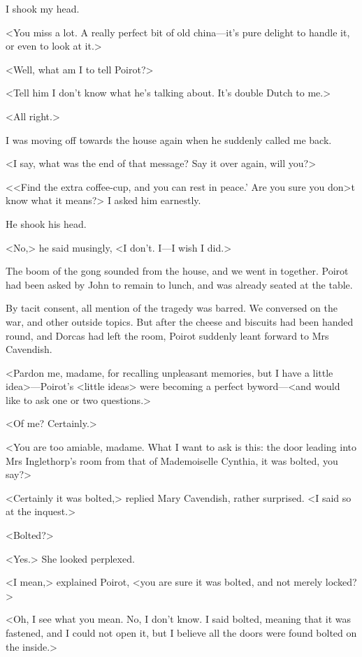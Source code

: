  I shook my head. 

 <You miss a lot. A really perfect bit of old china—it's pure delight to handle it, or even to look at it.> 

 <Well, what am I to tell Poirot?> 

 <Tell him I don't know what he's talking about. It's double Dutch to me.> 

 <All right.> 

 I was moving off towards the house again when he suddenly called me back. 

 <I say, what was the end of that message? Say it over again, will you?> 

 <<Find the extra coffee-cup, and you can rest in peace.' Are you sure you don>t know what it means?> I asked him earnestly. 

 He shook his head. 

 <No,> he said musingly, <I don't. I—I wish I did.> 

 The boom of the gong sounded from the house, and we went in together. Poirot had been asked by John to remain to lunch, and was already seated at the table. 

 By tacit consent, all mention of the tragedy was barred. We conversed on the war, and other outside topics. But after the cheese and biscuits had been handed round, and Dorcas had left the room, Poirot suddenly leant forward to Mrs Cavendish. 

 <Pardon me, madame, for recalling unpleasant memories, but I have a little idea>—Poirot's <little ideas> were becoming a perfect byword—<and would like to ask one or two questions.> 

 <Of me? Certainly.> 

 <You are too amiable, madame. What I want to ask is this: the door leading into Mrs Inglethorp's room from that of Mademoiselle Cynthia, it was bolted, you say?> 

 <Certainly it was bolted,> replied Mary Cavendish, rather surprised. <I said so at the inquest.> 

 <Bolted?> 

 <Yes.> She looked perplexed. 

 <I mean,> explained Poirot, <you are sure it was bolted, and not merely locked?> 

 <Oh, I see what you mean. No, I don't know. I said bolted, meaning that it was fastened, and I could not open it, but I believe all the doors were found bolted on the inside.> 

